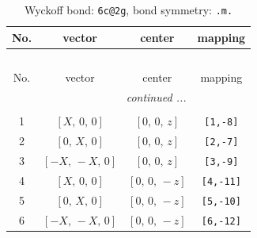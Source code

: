 \documentclass[fleqn,8pt]{jsarticle}
\begin{document}
\renewcommand{\arraystretch}{1.2}
\begin{longtable}{cccc}
\caption{Wyckoff bond: {\tt 6c@2g}, bond symmetry: {\tt .m.}}
 \\
 \hline \hline
No. & vector & center & mapping \\ \hline \endfirsthead

\multicolumn{3}{l}{\tablename\ \thetable{}} \\
 \hline \hline
No. & vector & center & mapping \\ \hline \endhead

 \hline \hline
\multicolumn{3}{r}{\footnotesize\it continued ...} \\ \endfoot

 \hline \hline
\multicolumn{3}{r}{} \\ \endlastfoot

1 & $\left[ X,\, 0,\, 0 \right]$ & $\left[ 0,\, 0,\, z \right]$ & {\tt [1,-8]} \\ \hline
2 & $\left[ 0,\, X,\, 0 \right]$ & $\left[ 0,\, 0,\, z \right]$ & {\tt [2,-7]} \\ \hline
3 & $\left[ - X,\, - X,\, 0 \right]$ & $\left[ 0,\, 0,\, z \right]$ & {\tt [3,-9]} \\ \hline
4 & $\left[ X,\, 0,\, 0 \right]$ & $\left[ 0,\, 0,\, - z \right]$ & {\tt [4,-11]} \\ \hline
5 & $\left[ 0,\, X,\, 0 \right]$ & $\left[ 0,\, 0,\, - z \right]$ & {\tt [5,-10]} \\ \hline
6 & $\left[ - X,\, - X,\, 0 \right]$ & $\left[ 0,\, 0,\, - z \right]$ & {\tt [6,-12]} \\
\end{longtable}
\renewcommand{\arraystretch}{1.2}
\end{document}
